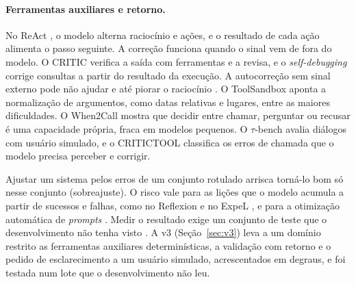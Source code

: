 \paragraph{Ferramentas auxiliares e retorno.} No ReAct \cite{yao2023react}, o modelo alterna raciocínio e ações, e o resultado de cada ação alimenta o passo seguinte. A correção funciona quando o sinal vem de fora do modelo. O CRITIC \cite{gou2024critic} verifica a saída com ferramentas e a revisa, e o \textit{self-debugging} \cite{chen2024selfdebug} corrige consultas a partir do resultado da execução. A autocorreção sem sinal externo \cite{madaan2023selfrefine} pode não ajudar e até piorar o raciocínio \cite{huang2024cannot}. O ToolSandbox \cite{lu2025toolsandbox} aponta a normalização de argumentos, como datas relativas e lugares, entre as maiores dificuldades. O When2Call \cite{ross2025when2call} mostra que decidir entre chamar, perguntar ou recusar é uma capacidade própria, fraca em modelos pequenos. O $\tau$-bench \cite{yao2025taubench} avalia diálogos com usuário simulado, e o CRITICTOOL \cite{huang2025critictool} classifica os erros de chamada que o modelo precisa perceber e corrigir.

Ajustar um sistema pelos erros de um conjunto rotulado arrisca torná-lo bom só nesse conjunto (sobreajuste). O risco vale para as lições que o modelo acumula a partir de sucessos e falhas, como no Reflexion \cite{shinn2023reflexion} e no ExpeL \cite{zhao2024expel}, e para a otimização automática de \textit{prompts} \cite{yang2024opro,khattab2024dspy}. Medir o resultado exige um conjunto de teste que o desenvolvimento não tenha visto \cite{dwork2015reusable}. A v3 (Seção~\ref{sec:v3}) leva a um domínio restrito as ferramentas auxiliares determinísticas, a validação com retorno e o pedido de esclarecimento a um usuário simulado, acrescentados em degraus, e foi testada num lote que o desenvolvimento não leu.
